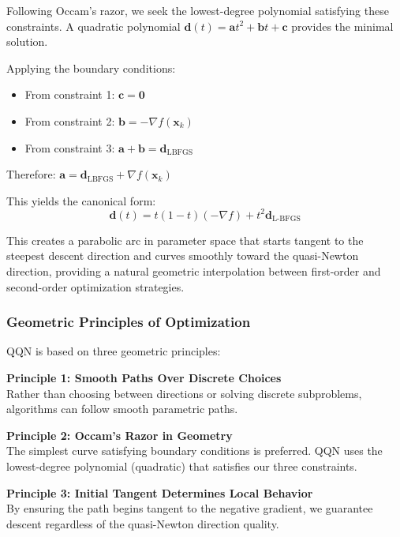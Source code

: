 Following Occam's razor, we seek the lowest-degree polynomial satisfying these constraints.
A quadratic polynomial \(\mathbf{d}(t) = \mathbf{a}t^2 + \mathbf{b}t + \mathbf{c}\) provides the minimal solution.

Applying the boundary conditions:

\begin{itemize}
\tightlist
\item
  From constraint 1: \(\mathbf{c} = \mathbf{0}\)
\item
  From constraint 2: \(\mathbf{b} = -\nabla f(\mathbf{x}_k)\)
\item
  From constraint 3: \(\mathbf{a} + \mathbf{b} = \mathbf{d}_{\text{LBFGS}}\)
\end{itemize}

Therefore: \(\mathbf{a} = \mathbf{d}_{\text{LBFGS}} + \nabla f(\mathbf{x}_k)\)

This yields the canonical form:
\[\mathbf{d}(t) = t(1-t)(-\nabla f) + t^2 \mathbf{d}_{\text{L-BFGS}}\]

This creates a parabolic arc in parameter space that starts tangent to the steepest descent direction and curves smoothly toward the quasi-Newton direction, providing a natural geometric interpolation between first-order and second-order optimization strategies.

\hypertarget{geometric-principles-of-optimization}{%
\subsubsection{Geometric Principles of Optimization}\label{geometric-principles-of-optimization}}

QQN is based on three geometric principles:

\textbf{Principle 1: Smooth Paths Over Discrete Choices}\\
Rather than choosing between directions or solving discrete subproblems, algorithms can follow smooth parametric paths.

\textbf{Principle 2: Occam's Razor in Geometry}\\
The simplest curve satisfying boundary conditions is preferred. QQN uses the lowest-degree polynomial (quadratic) that satisfies our three constraints.

\textbf{Principle 3: Initial Tangent Determines Local Behavior}\\
By ensuring the path begins tangent to the negative gradient, we guarantee descent regardless of the quasi-Newton direction quality.

